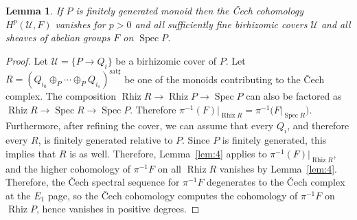 \documentclass[10pt]{article}
\numberwithin{equation}{section}
\newtheorem{lemma}[paragraph]{Lemma}
\theoremstyle{definition}
\theoremstyle{remark}
\def\Spec{\operatorname{Spec}}
\def\spec{\Spec}
\def\Rh{\operatorname{Rhiz}}
\begin{document}
\begin{lemma} \label{lem:5}
	If $P$ is finitely generated monoid then the \v Cech cohomology $H^p(\mathcal U, F)$ vanishes for $p > 0$ and all sufficiently fine birhizomic covers $\mathcal U$ and all sheaves of abelian groups $F$ on $\spec P$.
\end{lemma}





\begin{proof}
	Let $\mathcal U = \{ P \to Q_i \}$ be a birhizomic cover of $P$.  Let $R = (Q_{i_0} \oplus_P \cdots \oplus_P Q_{i_s})^{\mathrm{sat}\sharp}$ be one of the monoids contributing to the \v Cech complex.  The composition $\Rh R \to \Rh P \to \spec P$ can also be factored as $\Rh R \to \spec R \to \spec P$.  Therefore $\pi^{-1} (F) \big|_{\Rh R} = \pi^{-1} \bigl( F \big|_{\spec R} \bigr)$.  Furthermore, after refining the cover, we can assume that every $Q_i$, and therefore every $R$, is finitely generated relative to $P$.  Since $P$ is finitely generated, this implies that $R$ is as well.  Therefore, Lemma~\ref{lem:4} applies to $\pi^{-1} (F) \big|_{\Rh R}$, and the higher cohomology of $\pi^{-1} F$ on all $\Rh R$ vanishes by Lemma~\ref{lem:4}.  Therefore, the \v Cech spectral sequence for $\pi^{-1} F$ degenerates to the \v Cech complex at the $E_1$ page, so the \v Cech cohomology computes the cohomology of $\pi^{-1} F$ on $\Rh P$, hence vanishes in positive degrees.
\end{proof}
\end{document}
